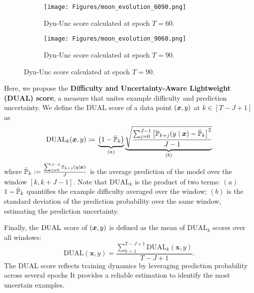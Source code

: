 \begin{figure}[t]
    \captionsetup{type=figure}
    \centering
    \begin{subfigure}{0.48\linewidth}
        \centering
        \texttt{[image: Figures/moon\_evolution\_6090.png]}
        \caption{Dyn-Unc score calculated at epoch $T=60$.}
        \label{fig:moon_evolution_60}
    \end{subfigure}
    \begin{subfigure}{0.48\linewidth}
        \centering
        \texttt{[image: Figures/moon\_evolution\_9060.png]}
        \caption{Dyn-Unc score calculated at epoch $T=90$.}
        \label{fig:moon_evolution_90}
    \end{subfigure}
    \label{fig:Moon_plot}
\end{figure}

Here, we propose the \textbf{Difficulty and Uncertainty-Aware Lightweight (DUAL) score}, a measure that unites example difficulty and prediction uncertainty. We define the DUAL score of a data point $({\bm{x}}, y)$ at $k \in [T-J+1]$ as
\begin{equation}
\label{eq:DUAL_score_window}
    \mathrm{DUAL}_k(\bm{x}, y) \coloneq \\ \underbrace{\left( 1-\Bar{{\mathbb{P}}}_k \right)}_{(a)} \underbrace{\sqrt{\frac{\sum_{j=0}^{J-1}\left[ {\mathbb{P}}_{k+j}(y \mid {\bm{x}}) - \Bar{{\mathbb{P}}}_k \right]^2}{J-1}}}_{(b)}
\end{equation}
where $\Bar{{\mathbb{P}}}_k := \frac{\sum_{j=0}^{J-1} {\mathbb{P}}_{k+j}  (y \mid {\bm{x}})}{J}$ is the average prediction of the model over the window $[k, k+J-1]$. Note that $\mathrm{DUAL}_k$ is the product of two terms: $(a)$ $1 - \Bar{{\mathbb{P}}}_k $ quantifies the example difficulty averaged over the window; $(b)$ is the standard deviation of the prediction probability over the same window, estimating the prediction uncertainty.

Finally, the $\rm DUAL$ score of $({\bm{x}}, y)$ is defined as the mean of $\mathrm{DUAL}_k$ scores over all windows:
\begin{equation}
\label{eq:DUAL_score}
    \mathrm{DUAL}(\bm{x}, y) = \frac{\sum_{k=1}^{T-J+1} \mathrm{DUAL}_k(\bm{x}, y)}{T-J+1}.
\end{equation}
The DUAL score reflects training dynamics by leveraging prediction probability across several epochs It provides a reliable estimation to identify the most uncertain examples. 

